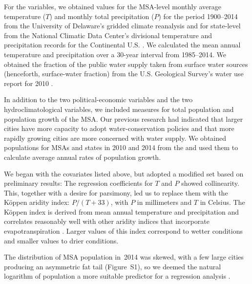 \documentclass[draft,linenumbers]{agujournal}\usepackage{knitr}
\begin{document}
For the  variables, we
obtained values for the MSA-level monthly average temperature ($T$) and monthly
total precipitation ($P$) for the period 1900--2014 from the University of Delaware's
gridded climate reanalysis
\citep{matsuura:gridded.temp:2015,matsuura:gridded.precip:2015}
and for state-level from the National Climatic Data Center's divisional temperature
and precipitation records for the Continental U.S.
\citep{vose:nclimdiv:2014}.
We calculated the mean annual temperature and precipitation over a
30-year interval from 1985--2014.
We obtained the fraction of the public water supply taken from surface water sources
(henceforth, surface-water fraction) from the U.S. Geological
Survey's water use report for 2010 \citep{maupin:water.use:2014}.

In addition to the two political-economic variables and the two hydroclimatological variables,
we included measures for total population and population growth of the MSA. Our previous research had
indicated that larger cities have more capacity to adopt water-conservation policies and that more
rapidly growing cities are more concerned with water supply. We obtained populations for MSAs and states
in 2010 and 2014 from the \citet{census:population:2015} and used them to calculate average annual rates
of population growth.

We began with the covariates listed above, but adopted a modified set based on
preliminary results: The regression coefficients for $T$ and $P$ showed
collinearity.
This, together with a desire for parsimony, led us to replace them with the
K\"oppen aridity index: $P / (T + 33)$, with $P$ in millimeters and $T$ in
Celsius.
The K\"oppen index is
derived from mean annual temperature and precipitation
and correlates reasonably well with other aridity indices
that incorporate evapotranspiration
\citep{quan:aridity:2013}.
Larger values of this index correspond to wetter conditions
and smaller values to drier conditions.

The distribution of MSA population in~2014 was skewed, with
a few large cities producing an asymmetric fat tail (Figure~S1),
so we deemed the natural logarithm of population
a more suitable predictor
for a regression analysis \citep[pp.~59--61]{gelman:arm:2007}.
\end{document}
